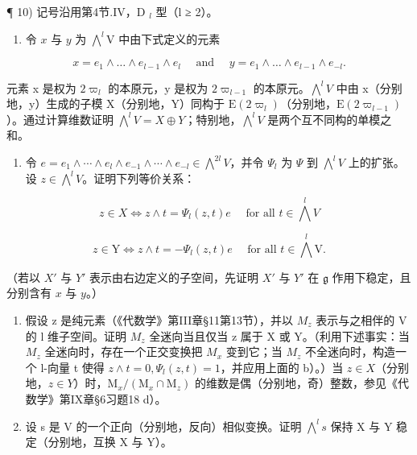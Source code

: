 ¶ 10) 记号沿用第4节.IV，D \(_{l}\) 型（l ≥ 2）。

\begin{enumerate}
\def\labelenumi{\alph{enumi})}
\tightlist
\item
  令 \(x\) 与 \(y\) 为 \(\bigwedge^{l} \mathrm{V}\) 中由下式定义的元素
\end{enumerate}

\[
x = e _ {1} \wedge \dots \wedge e _ {l - 1} \wedge e _ {l} \quad \text { and } \quad y = e _ {1} \wedge \dots \wedge e _ {l - 1} \wedge e _ {- l}.
\]

元素 x 是权为 \(2\varpi_{l}\) 的本原元，y 是权为 \(2\varpi_{l-1}\) 的本原元。\(\bigwedge^{l}V\) 中由 x（分别地，y）生成的子模 X（分别地，Y）同构于 \(\mathrm{E}(2\varpi_{l})\)（分别地，\(\mathrm{E}(2\varpi_{l-1})\)）。通过计算维数证明 \(\bigwedge^{l}V = X \oplus Y\)；特别地，\(\bigwedge^{l}V\) 是两个互不同构的单模之和。

\begin{enumerate}
\def\labelenumi{\alph{enumi})}
\setcounter{enumi}{1}
\tightlist
\item
  令 \(e = e_{1} \wedge \cdots \wedge e_{l} \wedge e_{-1} \wedge \cdots \wedge e_{-l} \in \bigwedge^{2l}V\)，并令 \(\varPsi_{l}\) 为 \(\varPsi\) 到 \(\bigwedge^{l}V\) 上的扩张。设 \(z \in \bigwedge^{l}V\)。证明下列等价关系：
\end{enumerate}

\[
z \in X \Longleftrightarrow z \wedge t = \Psi_ {l} (z, t) e \quad \text {   for   all   } t \in \bigwedge^ {l} V
\]

\[
z \in \mathrm{Y} \Longleftrightarrow z \wedge t = - \Psi_ {l} (z, t) e \quad \text {   for   all   } t \in \bigwedge^ {l} \mathrm{V}.
\]

（若以 \(X'\) 与 \(Y'\) 表示由右边定义的子空间，先证明 \(X'\) 与 \(Y'\) 在 \(\mathfrak{g}\) 作用下稳定，且分别含有 \(x\) 与 \(y\)。）

\begin{enumerate}
\def\labelenumi{\alph{enumi})}
\setcounter{enumi}{2}
\item
  假设 z 是纯元素（《代数学》第III章§11第13节），并以 \(M_{z}\) 表示与之相伴的 V 的 l 维子空间。证明 \(M_{z}\) 全迷向当且仅当 z 属于 X 或 Y。（利用下述事实：当 \(M_{z}\) 全迷向时，存在一个正交变换把 \(M_{x}\) 变到它；当 \(M_{z}\) 不全迷向时，构造一个 l-向量 t 使得 \(z \wedge t = 0, \Psi_{l}(z, t) = 1\)，并应用上面的 b）。）当 \(z \in X\)（分别地，\(z \in Y\)）时，\(\mathrm{M}_{x}/(\mathrm{M}_{x} \cap \mathrm{M}_{z})\) 的维数是偶（分别地，奇）整数，参见《代数学》第IX章§6习题18 d）。
\item
  设 s 是 V 的一个正向（分别地，反向）相似变换。证明 \(\bigwedge^{l}s\) 保持 X 与 Y 稳定（分别地，互换 X 与 Y）。
\end{enumerate}


